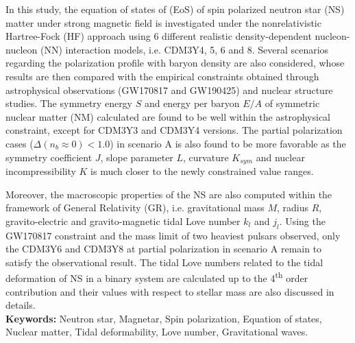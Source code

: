 In this study, the equation of states of (\gls{EoS}) of spin polarized neutron star (\gls{NS}) matter under strong magnetic field is investigated under the nonrelativistic Hartree-Fock (\gls{HF}) approach using 6 different realistic density-dependent nucleon-nucleon (\gls{NN}) interaction models, i.e. CDM3Y4, 5, 6 and 8. Several scenarios regarding the polarization profile with baryon density are also considered, whose results are then compared with the empirical constraints obtained through astrophysical observations (GW170817 and GW190425) and nuclear structure studies. The symmetry energy $S$ and energy per baryon $E/A$ of symmetric nuclear matter (\gls{NM}) calculated are found to be well within the astrophysical constraint, except for CDM3Y3 and CDM3Y4 versions. The partial polarization cases ($\Delta(n_b\approx 0) < 1.0$) in scenario A is also found to be more favorable as the symmetry coefficient $J$, slope parameter $L$, curvature $K_{sym}$ and nuclear incompressibility $K$ is much closer to the newly constrained value ranges.\par
Moreover, the macroscopic properties of the \gls{NS} are also computed within the framework of General Relativity (\gls{GR}), i.e. gravitational mass $M$, radius $R$, gravito-electric and gravito-magnetic tidal Love number $k_l$ and $j_l$. Using the GW170817 constraint and the mass limit of two heaviest pulsars observed, only the CDM3Y6 and CDM3Y8 at partial polarization in scenario A remain to satisfy the observational result. The tidal Love numbers related to the tidal deformation of \gls{NS} in a binary system are calculated up to the 4\textsuperscript{th} order contribution and their values with respect to stellar mass are also discussed in details.\\[5mm]
\textbf{Keywords:} Neutron star, Magnetar, Spin polarization, Equation of states, Nuclear matter, Tidal deformability, Love number, Gravitational waves.
